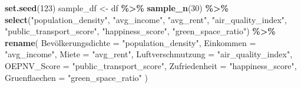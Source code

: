 \documentclass[
]{article}
\newenvironment{Shaded}{\begin{snugshade}}{\end{snugshade}}
\newcommand{\AttributeTok}[1]{\textcolor[rgb]{0.13,0.29,0.53}{#1}}
\newcommand{\DecValTok}[1]{\textcolor[rgb]{0.00,0.00,0.81}{#1}}
\newcommand{\FunctionTok}[1]{\textcolor[rgb]{0.13,0.29,0.53}{\textbf{#1}}}
\newcommand{\NormalTok}[1]{#1}
\newcommand{\OtherTok}[1]{\textcolor[rgb]{0.56,0.35,0.01}{#1}}
\newcommand{\SpecialCharTok}[1]{\textcolor[rgb]{0.81,0.36,0.00}{\textbf{#1}}}
\newcommand{\StringTok}[1]{\textcolor[rgb]{0.31,0.60,0.02}{#1}}
\begin{document}
\begin{Shaded}
\begin{Highlighting}[]
\FunctionTok{set.seed}\NormalTok{(}\DecValTok{123}\NormalTok{)}
\NormalTok{sample\_df }\OtherTok{\textless{}{-}}\NormalTok{  df }\SpecialCharTok{\%\textgreater{}\%} 
  \FunctionTok{sample\_n}\NormalTok{(}\DecValTok{30}\NormalTok{) }\SpecialCharTok{\%\textgreater{}\%} 
  \FunctionTok{select}\NormalTok{(}\StringTok{"population\_density"}\NormalTok{, }\StringTok{"avg\_income"}\NormalTok{, }\StringTok{"avg\_rent"}\NormalTok{, }\StringTok{"air\_quality\_index"}\NormalTok{, }\StringTok{"public\_transport\_score"}\NormalTok{, }\StringTok{"happiness\_score"}\NormalTok{, }\StringTok{"green\_space\_ratio"}\NormalTok{) }\SpecialCharTok{\%\textgreater{}\%} 
  \FunctionTok{rename}\NormalTok{(}
\NormalTok{    Bevölkerungsdichte }\OtherTok{=} \StringTok{"population\_density"}\NormalTok{, }
    \AttributeTok{Einkommen =} \StringTok{"avg\_income"}\NormalTok{, }
    \AttributeTok{Miete =} \StringTok{"avg\_rent"}\NormalTok{, }
    \AttributeTok{Luftverschmutzung =} \StringTok{"air\_quality\_index"}\NormalTok{, }
    \AttributeTok{OEPNV\_Score =} \StringTok{"public\_transport\_score"}\NormalTok{, }
    \AttributeTok{Zufriedenheit =} \StringTok{"happiness\_score"}\NormalTok{, }
    \AttributeTok{Gruenflaechen =} \StringTok{"green\_space\_ratio"}
\NormalTok{  )}


\end{Highlighting}
\end{Shaded}
\end{document}
